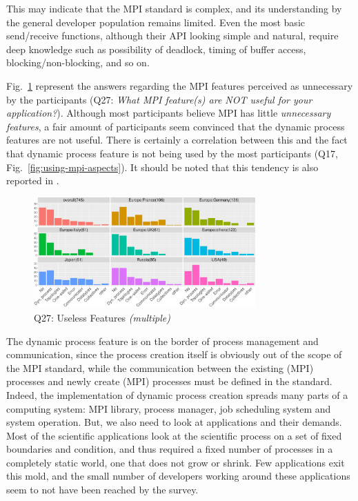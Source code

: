 \documentclass[preprint,5p,times]{elsarticle}
\def\myquote#1{{\it #1}}
\begin{document}
This may indicate that the MPI standard is complex, and its understanding by the
general developer population remains limited. Even the most basic send/receive
functions, although their API looking simple and natural, require deep knowledge
such as possibility of deadlock, timing of buffer access, blocking/non-blocking,
and so on.

Fig.~\ref{fig:useless-features} represent the answers regarding the MPI features
perceived as unnecessary by the participants (Q27: \myquote{What MPI feature(s)
are NOT useful for your application?}). Although most participants believe MPI
has little {\it unnecessary features}, a fair amount of participants seem
convinced that the dynamic process features are not useful. There is certainly a
correlation between this and the fact that dynamic process feature is not being
used by the most participants (Q17, Fig.~\ref{fig:using-mpi-aspects}). It should
be noted that this tendency is also reported in \cite{10.1145/3295500.3356176}.

\begin{figure}[htb]
  \begin{center}
    \includegraphics[width=8.5cm]{R-scripts/Q27.pdf}
    \caption{Q27: Useless Features {\it(multiple)}}
    \label{fig:useless-features}
  \end{center}
\end{figure}

The dynamic process feature is on the border of process management and
communication, since the process creation itself is obviously out of the scope
of the MPI standard, while the communication between the existing (MPI)
processes and newly create (MPI) processes must be defined in the standard.
Indeed, the implementation of dynamic process creation spreads many parts of a
computing system: MPI library, process manager, job scheduling system and system
operation.
%
But, we also need to look at applications and their demands. Most of the
scientific applications look at the scientific process on a set of fixed
boundaries and condition, and thus required a fixed number of processes in a
completely static world, one that does not grow or shrink. Few applications exit
this mold, and the small number of developers working around these applications
seem to not have been reached by the survey.
\end{document}
